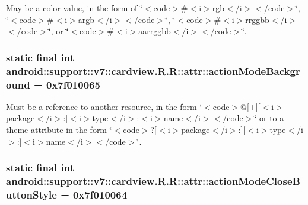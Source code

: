 May be a \hyperlink{classandroid_1_1support_1_1v7_1_1cardview_1_1_r_1_1color}{color} value, in the form of \char`\"{}$<$code$>$\#$<$i$>$rgb$<$/i$>$$<$/code$>$\char`\"{}, \char`\"{}$<$code$>$\#$<$i$>$argb$<$/i$>$$<$/code$>$\char`\"{}, \char`\"{}$<$code$>$\#$<$i$>$rrggbb$<$/i$>$$<$/code$>$\char`\"{}, or \char`\"{}$<$code$>$\#$<$i$>$aarrggbb$<$/i$>$$<$/code$>$\char`\"{}. \hypertarget{classandroid_1_1support_1_1v7_1_1cardview_1_1_r_1_1attr_82bd77929959327482baa698939a7536}{
\subsubsection[{actionModeBackground}]{\setlength{\rightskip}{0pt plus 5cm}static final int android::support::v7::cardview.R.R::attr::actionModeBackground = 0x7f010065}}
\label{classandroid_1_1support_1_1v7_1_1cardview_1_1_r_1_1attr_82bd77929959327482baa698939a7536}


Must be a reference to another resource, in the form \char`\"{}$<$code$>$@\mbox{[}+\mbox{]}\mbox{[}$<$i$>$package$<$/i$>$:\mbox{]}$<$i$>$type$<$/i$>$:$<$i$>$name$<$/i$>$$<$/code$>$\char`\"{} or to a theme attribute in the form \char`\"{}$<$code$>$?\mbox{[}$<$i$>$package$<$/i$>$:\mbox{]}\mbox{[}$<$i$>$type$<$/i$>$:\mbox{]}$<$i$>$name$<$/i$>$$<$/code$>$\char`\"{}. \hypertarget{classandroid_1_1support_1_1v7_1_1cardview_1_1_r_1_1attr_560c0a1f93e36ad000d8fd1c8828dfaf}{
\subsubsection[{actionModeCloseButtonStyle}]{\setlength{\rightskip}{0pt plus 5cm}static final int android::support::v7::cardview.R.R::attr::actionModeCloseButtonStyle = 0x7f010064}}
\label{classandroid_1_1support_1_1v7_1_1cardview_1_1_r_1_1attr_560c0a1f93e36ad000d8fd1c8828dfaf}


